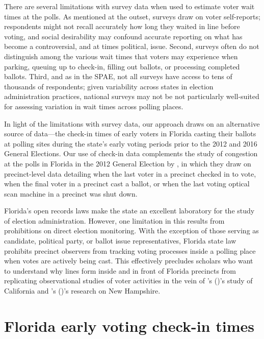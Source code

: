 \documentclass[12pt,titlepage]{article}
\newcommand{\possessivecite}[1]{\citeauthor{#1}'s (\citeyear{#1})}
\begin{document}
There are several limitations with survey data when used to estimate
voter wait times at the polls. As mentioned at the outset, surveys
draw on voter self-reports; respondents might not recall accurately
how long they waited in line before voting, and social desirability
may confound accurate reporting on what has become a controversial,
and at times political, issue. Second, surveys often do not
distinguish among the various wait times that voters may experience
when parking, queuing up to check-in, filling out ballots, or
processing completed ballots. Third, and as in the SPAE, not all
surveys have access to tens of thousands of respondents; given
variability across states in election administration practices,
national surveys may not be not particularly well-suited for assessing
variation in wait times across polling places.

In light of the limitations with survey data, our approach draws on an
alternative source of data---the check-in times of early voters in
Florida casting their ballots at polling sites during the state's
early voting periods prior to the 2012 and 2016 General Elections.
Our use of check-in data complements the study of congestion at the
polls in Florida in the 2012 General Election by
\cite{herronsmith:closingtimes}, in which they draw on precinct-level
data detailing when the last voter in a precinct checked in to vote,
when the final voter in a precinct cast a ballot, or when the last
voting optical scan machine in a precinct was shut down.

Florida's open records laws make the state an excellent laboratory for
the study of election administration.  However, one limitation in this
results from prohibitions on direct election monitoring.  With the
exception of those serving as candidate, political party, or ballot
issue representatives, Florida state law prohibits precinct observers
from tracking voting processes inside a polling place when votes are
actively being cast. This effectively precludes scholars who want to
understand why lines form inside and in front of Florida precincts
from replicating observational studies of voter activities in the vein
of \possessivecite{spencermarkovits:renege}'s study of California and
\possessivecite{herronsmith:hanoverstudy}'s research on New Hampshire.

\section*{Florida early voting check-in times}
\end{document}
